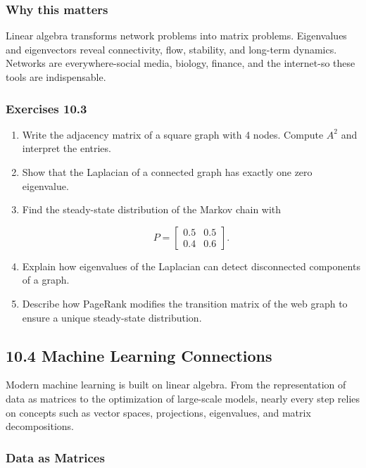 \documentclass[
  12pt,
  a4paper,
]{article}
\begin{document}
\subsubsection{Why this matters}\label{why-this-matters-38}

Linear algebra transforms network problems into matrix problems.
Eigenvalues and eigenvectors reveal connectivity, flow, stability, and
long-term dynamics. Networks are everywhere-social media, biology,
finance, and the internet-so these tools are indispensable.

\subsubsection{Exercises 10.3}\label{exercises-103}

\begin{enumerate}
\def\labelenumi{\arabic{enumi}.}
\item
  Write the adjacency matrix of a square graph with 4 nodes. Compute
  \(A^2\) and interpret the entries.
\item
  Show that the Laplacian of a connected graph has exactly one zero
  eigenvalue.
\item
  Find the steady-state distribution of the Markov chain with

  \[P = \begin{bmatrix} 0.5 & 0.5 \\ 0.4 & 0.6 \end{bmatrix}.\]
\item
  Explain how eigenvalues of the Laplacian can detect disconnected
  components of a graph.
\item
  Describe how PageRank modifies the transition matrix of the web graph
  to ensure a unique steady-state distribution.
\end{enumerate}

\subsection{10.4 Machine Learning
Connections}\label{104-machine-learning-connections}

Modern machine learning is built on linear algebra. From the
representation of data as matrices to the optimization of large-scale
models, nearly every step relies on concepts such as vector spaces,
projections, eigenvalues, and matrix decompositions.

\subsubsection{Data as Matrices}\label{data-as-matrices}
\end{document}
